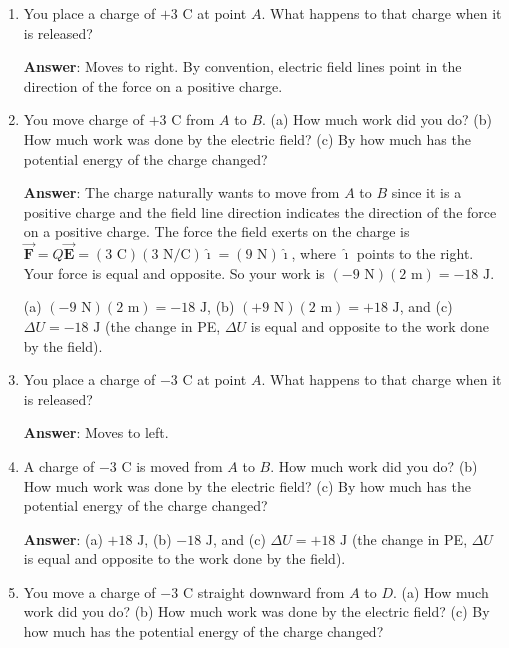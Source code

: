 \documentclass{article}
\newcommand{\ihat}[0]{\hat{\boldsymbol{\imath}}}
\newcommand{\bfvec}[1]{\vec{\mathbf{#1}}}
\begin{document}
\begin{enumerate}

  \item You place a charge of $+3\text{ C}$ at point $A$. What happens to that charge when it is released?

        \ifsolutions
          \textbf{Answer}: Moves to right. By convention, electric field lines point in the direction of the force on a positive charge.
        \else
          \vskip 36pt
        \fi

  \item You move charge of $+3\text{ C}$ from $A$ to $B$. (a) How much work did you do? (b) How much work was done by the electric field? (c) By how much has the potential energy of the charge changed?

        \ifsolutions
          \textbf{Answer}: The charge naturally wants to move from $A$ to $B$ since it is a positive charge and the field line direction indicates the direction of the force on a positive charge. The force the field exerts on the charge is $\bfvec{F}=Q\bfvec{E}=(3\text{ C})(3\text { N/C})\ihat = (9\text{ N})\ihat$, where $\ihat$ points to the right. Your force is equal and opposite. So your work is $(-9\text{ N})(2\text{ m}) = -18 \text{ J}$.
        
          (a) $(-9 \text{ N})(2\text { m})=-18\text{ J}$, (b) $(+9 \text{ N})(2\text { m})=+18\text{ J}$, and (c) $\Delta U = -18\text{ J}$ (the change in PE, $\Delta U$ is equal and opposite to the work done by the field).
        \else
          \vskip 36pt
        \fi

  \item You place a charge of $-3\text{ C}$ at point $A$. What happens to that charge when it is released?

        \ifsolutions
          \textbf{Answer}: Moves to left.
        \else
          \vskip 48pt
        \fi

  \item A charge of $-3\text{ C}$ is moved from $A$ to $B$. How much work did you do? (b) How much work was done by the electric field? (c) By how much has the potential energy of the charge changed?

        \ifsolutions
          \textbf{Answer}: (a) $+18\text{ J}$, (b) $-18\text{ J}$, and (c) $\Delta U = +18\text{ J}$ (the change in PE, $\Delta U$ is equal and opposite to the work done by the field).
        \else
          \vskip 48pt
        \fi

  \item You move a charge of $-3\text{ C}$ straight downward from $A$ to $D$. (a) How much work did you do? (b) How much work was done by the electric field? (c) By how much has the potential energy of the charge changed?


\end{enumerate}
\end{document}
